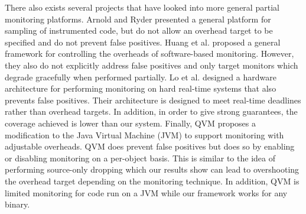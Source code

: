 There also exists several projects that have looked into more general partial
monitoring platforms. Arnold and Ryder \cite{arnold-pldi01} presented a general
platform for sampling of instrumented code, but do not allow an overhead target
to be specified and do not prevent false positives. Huang et al.
\cite{huang-sttt12} proposed a general framework for controlling the overheads
of software-based monitoring. However, they also do not explicitly address
false positives and only target monitors which degrade gracefully when
performed partially. Lo et al. \cite{lo-rtas14} designed a hardware
architecture for performing monitoring on hard real-time systems that also
prevents false positives. Their architecture is designed to meet real-time
deadlines rather than overhead targets. In addition, in order to give strong
guarantees, the coverage achieved is lower than our system. Finally, QVM
\cite{qvm-oopsla08} proposes a modification to the Java Virtual Machine (JVM) to
support monitoring with adjustable overheads. QVM does prevent false positives
but does so by enabling or disabling monitoring on a per-object basis. This is
similar to the idea of performing source-only dropping which our results show
can lead to overshooting the overhead target depending on the monitoring
technique. In addition, QVM is limited monitoring for code run on a JVM while
our framework works for any binary.



